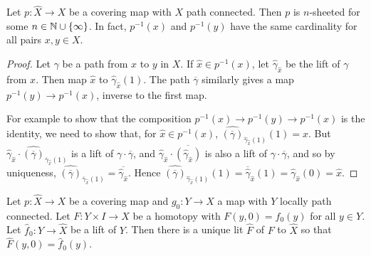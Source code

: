 \documentclass[10pt,a4paper]{article}
\begin{document}
\begin{corollary}
Let $p:\hat{X}\to X$ be a covering map with $X$ path connected. Then $p$ is $n$-sheeted for some $n \in \mathbb{N}\cup \{\infty\}$. In fact, $p^{-1}(x)$ and $p^{-1}(y)$ have the same cardinality for all pairs $x,y \in X$.
\end{corollary}
\begin{proof}
Let $\gamma$ be a path from $x$ to $y$ in $X$. If $\hat{x} \in p^{-1}(x)$, let $\hat{\gamma}_{\hat{x}}$ be the lift of $\gamma$ from $x$. Then map $\hat{x}$ to $\hat{\gamma}_{\hat{x}}(1)$. The path $\overline{\gamma}$ similarly gives a map $p^{-1}(y)\to p^{-1}(x)$, inverse to the first map.

For example to show that the composition $p^{-1}(x)\to p^{-1}(y) \to p^{-1}(x)$ is the identity, we need to show that, for $\hat{x} \in p^{-1}(x)$, $\hat{(\overline{\gamma})}_{\hat{\gamma}_{\hat{x}}(1)}(1) = \hat{x}$. But $\hat{\gamma}_{\hat{x}}\cdot \hat{(\overline{\gamma})}_{\overline{\gamma}_{\hat{x}} (1)}$ is a lift of $\gamma\cdot \overline{\gamma}$, and $\hat{\gamma}_{\hat{x}}\cdot \overline{(\hat{\gamma}_{\hat{x}})}$ is also a lift of $\gamma\cdot \overline{\gamma}$, and so by uniqueness, $\hat{(\overline{\gamma})}_{\overline{\gamma}_{\hat{x}}(1)} = \overline{\hat{\gamma}_{\hat{x}}}$. Hence $\hat{(\overline{\gamma})}_{\hat{\gamma}_{\hat{x}}(1)}(1) = \overline{\hat{\gamma}}_{\hat{x}}(1) = \hat{\gamma}_{\hat{x}}(0) = \hat{x}$.
\end{proof}
\begin{lemma}
Let $p:\hat{X}\to X$ be a covering map and $g_0:Y\to X$ a map with $Y$ locally path connected. Let $F:Y\times I \to X$ be a homotopy with $F(y,0) = f_0(y)$ for all $y \in Y$. Let $\hat{f}_0:Y \to \hat{X}$ be a lift of $Y$. Then there is a unique lit $\hat{F}$ of $F$ to $\hat{X}$ so that $\hat{F}(y,0) = \hat{f}_0(y)$.
\end{lemma}
\end{document}
